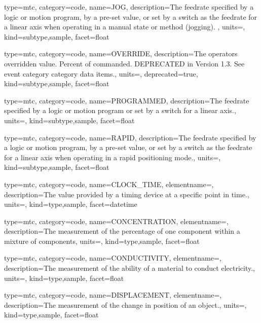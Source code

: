 {
  type=mtc,
  category=code,
  name={JOG},
  description={The feedrate specified by a logic or motion program, by a pre-set value, or set by a switch as the feedrate for a linear axis when operating in a manual state or method (jogging).  },
  units=,
  kind={subtype,sample},
  facet={\gls{float}}
}


{
  type=mtc,
  category=code,
  name={OVERRIDE},
  description={The operators overridden value. Percent of commanded.  DEPRECATED in Version 1.3.   See \gls{event category} category data items.},
  units=,
  deprecated={true},
  kind={subtype,sample},
  facet={\gls{float}}
}


{
  type=mtc,
  category=code,
  name={PROGRAMMED},
  description={The feedrate specified by a logic or motion program or set by a switch for a linear axis.},
  units=,
  kind={subtype,sample},
  facet={\gls{float}}
}


{
  type=mtc,
  category=code,
  name={RAPID},
  description={The feedrate specified by a logic or motion program, by a pre-set value, or set by a switch as the feedrate for a linear axis when operating in a rapid positioning mode.},
  units=,
  kind={subtype,sample},
  facet={\gls{float}}
}


{
  type=mtc,
  category=code,
  name={CLOCK\_TIME},
  elementname=,
  description={The value provided by a timing device at a specific point in time.},
  units=,
  kind={type,sample},
  facet={\gls{datetime}}
}


{
  type=mtc,
  category=code,
  name={CONCENTRATION},
  elementname=,
  description={The measurement of the percentage of one component within a mixture of components},
  units=,
  kind={type,sample},
  facet={\gls{float}}
}


{
  type=mtc,
  category=code,
  name={CONDUCTIVITY},
  elementname=,
  description={The measurement of the ability of a material to conduct electricity.},
  units=,
  kind={type,sample},
  facet={\gls{float}}
}


{
  type=mtc,
  category=code,
  name={DISPLACEMENT},
  elementname=,
  description={The measurement of the change in position of an object.},
  units=,
  kind={type,sample},
  facet={\gls{float}}
}


